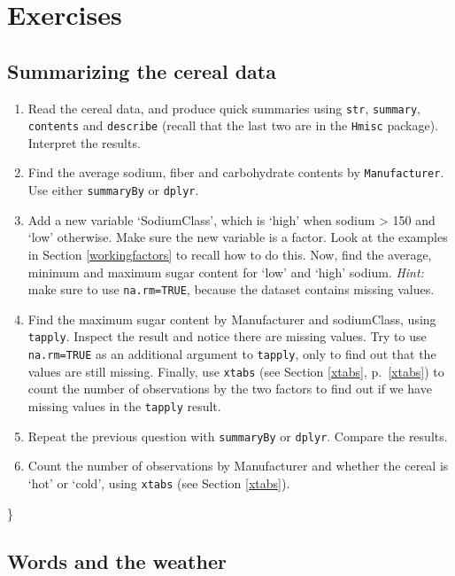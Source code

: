\documentclass[]{book}
\begin{document}
\hypertarget{exercises-2}{%
\section{Exercises}\label{exercises-2}}

\hypertarget{summarizing-the-cereal-data}{%
\subsection{Summarizing the cereal data}\label{summarizing-the-cereal-data}}

\begin{enumerate}
\def\labelenumi{\arabic{enumi}.}
\item
  Read the cereal data, and produce quick summaries using \texttt{str}, \texttt{summary}, \texttt{contents} and \texttt{describe} (recall that the last two are in the \texttt{Hmisc} package). Interpret the results.
\item
  Find the average sodium, fiber and carbohydrate contents by \texttt{Manufacturer}. Use either \texttt{summaryBy} or \texttt{dplyr}.
\item
  Add a new variable `SodiumClass', which is `high' when sodium \textgreater{} 150 and `low' otherwise. Make sure the new variable is a factor. Look at the examples in Section \ref{workingfactors} to recall how to do this. Now, find the average, minimum and maximum sugar content for `low' and `high' sodium. \emph{Hint:} make sure to use \texttt{na.rm=TRUE}, because the dataset contains missing values.
\item
  Find the maximum sugar content by Manufacturer and sodiumClass, using \texttt{tapply}. Inspect the result and notice there are missing values. Try to use \texttt{na.rm=TRUE} as an additional argument to \texttt{tapply}, only to find out that the values are still missing. Finally, use \texttt{xtabs} (see Section \ref{xtabs}, p.~\ref{xtabs}) to count the number of observations by the two factors to find out if we have missing values in the \texttt{tapply} result.
\item
  Repeat the previous question with \texttt{summaryBy} or \texttt{dplyr}. Compare the results.
\item
  Count the number of observations by Manufacturer and whether the cereal is `hot' or `cold', using \texttt{xtabs} (see Section \ref{xtabs}).
\end{enumerate}

\}

\hypertarget{words-and-the-weather}{%
\subsection{Words and the weather}\label{words-and-the-weather}}
\end{document}

